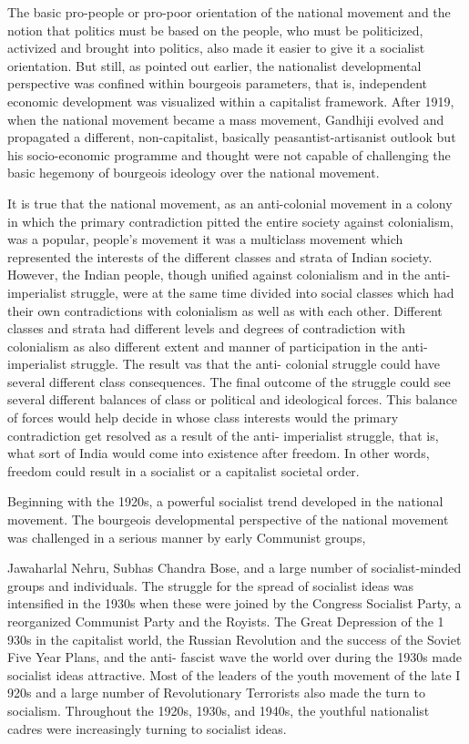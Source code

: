 The basic pro-people or pro-poor orientation of the national movement and the notion that politics must be based on the people, who must be politicized, activized and brought into politics, also made it easier to give it a socialist orientation. But still, as pointed out earlier, the nationalist developmental perspective was confined within bourgeois parameters, that is, independent economic development was visualized within a capitalist framework. After 1919, when the national movement became a mass movement, Gandhiji evolved and propagated a different, non-capitalist, basically peasantist-artisanist outlook but his socio-economic programme and thought were not capable of challenging the basic hegemony of bourgeois ideology over the national movement.

It is true that the national movement, as an anti-colonial movement in a colony in which the primary contradiction pitted the entire society against colonialism, was a popular, people's movement it was a multiclass movement which represented the interests of the different classes and strata of Indian society. However, the Indian people, though unified against colonialism and in the anti-imperialist struggle, were at the same time divided into social classes which had their own contradictions with colonialism as well as with each other. Different classes and strata had different levels and degrees of contradiction with colonialism as also different extent and manner of participation in the anti-imperialist struggle. The result vas that the anti- colonial struggle could have several different class consequences. The final outcome of the struggle could see several different balances of class or political and ideological forces. This balance of forces would help decide in whose class interests would the primary contradiction get resolved as a result of the anti- imperialist struggle, that is, what sort of India would come into existence after freedom. In other words, freedom could result in a socialist or a capitalist societal order.

Beginning with the 1920s, a powerful socialist trend developed in the national movement. The bourgeois developmental perspective of the national movement was challenged in a serious manner by early Communist groups,

Jawaharlal Nehru, Subhas Chandra Bose, and a large number of socialist-minded groups and individuals. The struggle for the spread of socialist ideas was intensified in the 1930s when these were joined by the Congress Socialist Party, a reorganized Communist Party and the Royists. The Great Depression of the 1 930s in the capitalist world, the Russian Revolution and the success of the Soviet Five Year Plans, and the anti- fascist wave the world over during the 1930s made socialist ideas attractive. Most of the leaders of the youth movement of the late I 920s and a large number of Revolutionary Terrorists also made the turn to socialism. Throughout the 1920s, 1930s, and 1940s, the youthful nationalist cadres were increasingly turning to socialist ideas.

